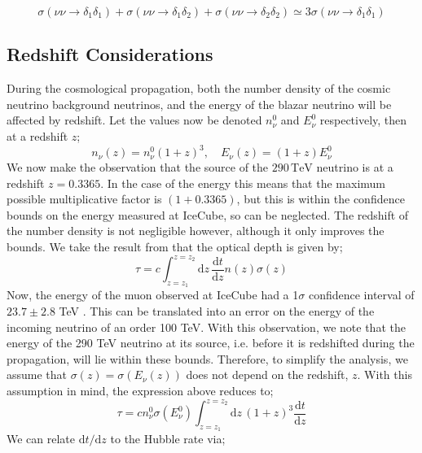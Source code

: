\documentclass[11pt]{article}
\numberwithin{equation}{section}
\numberwithin{figure}{section}
\numberwithin{table}{section}
\newcommand{\upd}[1]{\text{d}#1 \,}
\newcommand{\ud}{\text{d}}
\begin{document}
\begin{equation}
  \sigma(\nu\nu \rightarrow \delta_1 \delta_1) + \sigma(\nu\nu \rightarrow \delta_1 \delta_2) + \sigma(\nu\nu \rightarrow \delta_2 \delta_2) \simeq 3 \sigma(\nu\nu \rightarrow \delta_1 \delta_1)
\end{equation}



\subsection{Redshift Considerations}



During the cosmological propagation, both the number density of the cosmic neutrino background neutrinos, and the energy of the blazar neutrino will be affected by redshift. Let the values now be denoted $n_\nu^0$ and $E_\nu^0$ respectively, then at a redshift $z$;
\begin{equation}
  n_\nu(z) = n_\nu^0 (1 + z)^3, \quad E_\nu(z) = (1 + z)E_\nu^0
\end{equation}
We now make the observation that the source of the $290 \, \textrm{TeV}$ neutrino is at a redshift $z = 0.3365$. In the case of the energy this means that the maximum possible multiplicative factor is $(1 + 0.3365)$, but this is within the confidence bounds on the energy measured at IceCube, so can be neglected. The redshift of the number density is not negligible however, although it only improves the bounds. We take the result from \cite{Farzan2014} that the optical depth is given by;
\begin{equation}
  \tau = c\int_{z = z_1}^{z = z_2}{\upd{z}\frac{\ud t}{\ud z}n(z)\sigma(z)}
\end{equation}
Now, the energy of the muon observed at IceCube had a 1$\sigma$ confidence interval of $23.7 \pm 2.8$ TeV \cite{IceCube2018}. This can be translated into an error on the energy of the incoming neutrino of an order 100 TeV. With this observation, we note that the energy of the 290 TeV neutrino at its source, i.e. before it is redshifted during the propagation, will lie within these bounds. Therefore, to simplify the analysis, we assume that $\sigma(z) = \sigma(E_\nu(z))$ does not depend on the redshift, $z$. With this assumption in mind, the expression above reduces to; 
\begin{equation}
  \tau = c n_\nu^0 \sigma(E_\nu^0) \int_{z = z_1}^{z = z_2}{\upd{z}(1 + z)^3 \frac{\ud t}{\ud z}}
\end{equation}
We can relate $\ud t/\ud z$ to the Hubble rate via;
\end{document}
